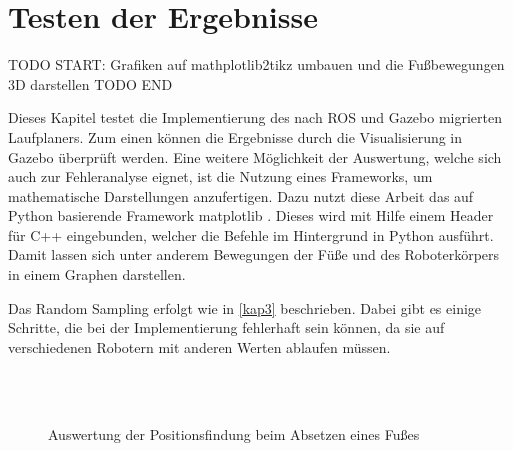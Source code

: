 \chapter{Testen der Ergebnisse}
\label{kap6}

TODO START:
Grafiken auf mathplotlib2tikz umbauen und die Fußbewegungen 3D darstellen
TODO END

Dieses Kapitel testet die Implementierung des nach \ac{ROS} und Gazebo migrierten Laufplaners. Zum einen können die Ergebnisse durch die Visualisierung in Gazebo überprüft werden. Eine weitere Möglichkeit der Auswertung, welche sich auch zur Fehleranalyse eignet, ist die Nutzung eines Frameworks, um mathematische Darstellungen anzufertigen. Dazu nutzt diese Arbeit das auf Python basierende Framework matplotlib \autocite{barrett2005matplotlib}. Dieses wird mit Hilfe einem Header für C++ eingebunden, welcher die Befehle im Hintergrund in Python ausführt. Damit lassen sich unter anderem Bewegungen der Füße und des Roboterkörpers in einem Graphen darstellen.

Das Random Sampling erfolgt wie in \autoref{kap3} beschrieben. Dabei gibt es einige Schritte, die bei der Implementierung fehlerhaft sein können, da sie auf verschiedenen Robotern mit anderen Werten ablaufen müssen. 

\begin{figure}[t!]
  \centering
  \begin{subfigure}[b]{.5\linewidth}
    \centering
    \resizebox{\linewidth}{!}{
      
    }
    \label{kap5:footDownNormal1}
  \end{subfigure}%
  \begin{subfigure}[b]{.5\linewidth}
    \centering
    \resizebox{\linewidth}{!}{
      
    }
    \label{kap5:footDownNormal2}
  \end{subfigure}\\
  \\[\smallskipamount]
  \begin{subfigure}[b]{.5\linewidth}
    \centering
    \resizebox{\linewidth}{!}{
      
    }
    \label{kap5:footDownSpiral1}
  \end{subfigure}%
  \begin{subfigure}[b]{.5\linewidth}
    \centering
    \resizebox{\linewidth}{!}{
      
    }
    \label{kap5:footDownSpiral2}
  \end{subfigure}%
  \caption{Auswertung der Positionsfindung beim Absetzen eines Fußes}
  \label{kap5:footDown}
\end{figure}

